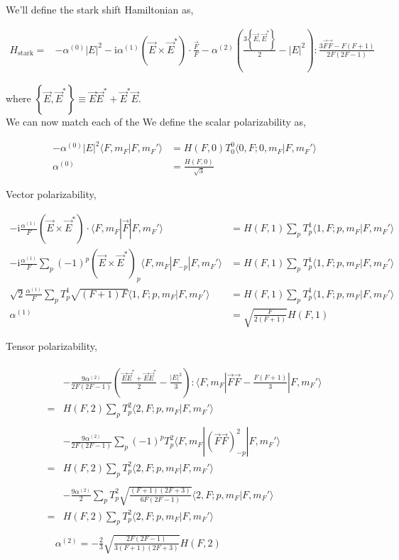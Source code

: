 \documentclass[10pt,fleqn]{article}
\newcommand{\ui}{\mathrm{i}}
\newcommand{\eqar}[1]
{
  \begin{align}
    #1
  \end{align}
}
\newcommand{\paren}[1]{{\left({#1}\right)}}
\newcommand{\abs}[1]{{\left|{#1}\right|}}
\newcommand{\crly}[1]{{\left\{{#1}\right\}}}
\begin{document}
We'll define the stark shift Hamiltonian as,
\eqar{
  H_{\mathrm{stark}}=&-\alpha^{(0)}\abs{E}^2-\ui\alpha^{(1)}\paren{\vec E\times \vec E^*}\cdot\frac{\vec F}{F}-\alpha^{(2)}\paren{\frac{3\crly{\vec E,\vec E^*}}{2}-\abs{E}^2}:\frac{3\vec F\vec F-F(F+1)}{2F(2F-1)}
}
where $\crly{\vec E,\vec E^*}\equiv\vec E\vec E^*+\vec E^*\vec E$.\\

We can now match each of the We define the scalar polarizability as,
\eqar{
  -\alpha^{(0)}\abs{E}^2\langle F,m_F|F,m_F'\rangle&=H(F,0)T^0_{0}\langle 0,F;0,m_F|F,m_F'\rangle\\
  \alpha^{(0)}&=\frac{H(F,0)}{\sqrt{3}}
}

Vector polarizability,
\eqar{
  -\ui\frac{\alpha^{(1)}}{F}\paren{\vec E\times \vec E^*}\cdot\langle F,m_F|\vec F|F,m_F'\rangle&=H(F,1)\sum_{p}T^1_{p}\langle 1,F;p,m_F|F,m_F'\rangle\\
  -\ui\frac{\alpha^{(1)}}{F}\sum_p(-1)^p\paren{\vec E\times \vec E^*}_p\langle F,m_F|F_{-p}|F,m_F'\rangle&=H(F,1)\sum_{p}T^1_{p}\langle 1,F;p,m_F|F,m_F'\rangle\\
  \sqrt{2}\frac{\alpha^{(1)}}{F}\sum_pT^1_p\sqrt{(F+1)F}\langle 1,F;p,m_F|F,m_F'\rangle&=H(F,1)\sum_{p}T^1_{p}\langle 1,F;p,m_F|F,m_F'\rangle\\
  \alpha^{(1)}&=\sqrt{\frac{F}{2(F+1)}}H(F,1)
}
Tensor polarizability,
\eqar{
  \begin{split}
    &-\frac{9\alpha^{(2)}}{2F(2F-1)}\paren{\frac{\vec E\vec E^*+\vec E\vec E^*}{2}-\frac{\abs{E}^2}{3}}:\langle F,m_F|\vec F\vec F-\frac{F(F+1)}3|F,m_F'\rangle\\
    =&H(F,2)\sum_{p}T^2_{p}\langle 2,F;p,m_F|F,m_F'\rangle
  \end{split}\\
  \begin{split}
    &-\frac{9\alpha^{(2)}}{2F(2F-1)}\sum_{p}(-1)^pT^2_{p}\langle F,m_F|(\vec F\vec F)^2_{-p}|F,m_F'\rangle\\
    =&H(F,2)\sum_{p}T^2_{p}\langle 2,F;p,m_F|F,m_F'\rangle
  \end{split}\\
  \begin{split}
    &-\frac{9\alpha^{(2)}}{2}\sum_{p}T^2_{p}
      \sqrt{\frac{(F+1)(2F+3)}{6F(2F-1)}}
      \langle 2,F;p,m_F|F,m_F'\rangle\\
    =&H(F,2)\sum_{p}T^2_{p}\langle 2,F;p,m_F|F,m_F'\rangle
  \end{split}\\
  \begin{split}
    &\alpha^{(2)}=-\frac{2}{3}\sqrt{\frac{2F(2F-1)}{3(F+1)(2F+3)}}H(F,2)
  \end{split}
}
\end{document}
